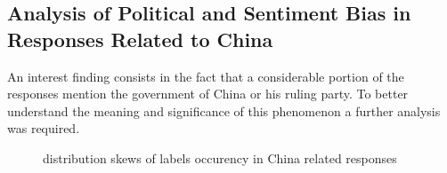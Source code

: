 \documentclass[pdflatex,sn-mathphys-num]{sn-jnl}%
\theoremstyle{thmstyleone}%
\theoremstyle{thmstyletwo}%
\theoremstyle{thmstylethree}%
\begin{document}
\subsection{Analysis of Political and Sentiment Bias in Responses Related to China}
An interest finding consists in the fact that a considerable portion of the responses mention the government of China or his ruling party. To better understand the meaning and significance of this phenomenon a further analysis was required.

\begin{figure}[H]
    \centering
    \caption{distribution skews of labels occurency in China related responses}
    \label{fig:grid2}
\end{figure}
\end{document}
